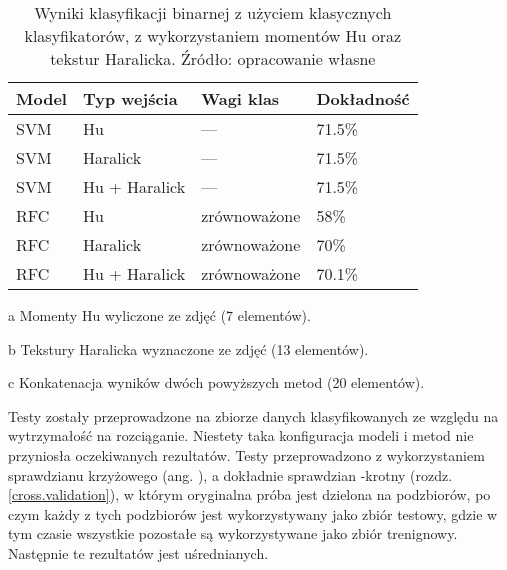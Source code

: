 \begin{table}[h]
	\centering
	\begin{threeparttable}
		\caption{Wyniki klasyfikacji binarnej z użyciem klasycznych klasyfikatorów, z wykorzystaniem momentów Hu oraz tekstur Haralicka. Źródło: opracowanie własne}
		\label{hu_haralick_table}
		\begin{tabularx}{1\textwidth}{ |X|X|X|X| }
		  \hline
		  \textbf{Model} & \textbf{Typ wejścia} & \textbf{Wagi klas} & \textbf{Dokładność}\\

		  \hline
		  SVM & Hu\tnote{a} & — & 71.5\%\\

		  \hline
		  SVM & Haralick\tnote{b} & — & 71.5\%\\

		  \hline
		  SVM & Hu + Haralick\tnote{c} & — & 71.5\%\\

		  \hline
		  RFC & Hu & zrównoważone & 58\%\\

		  \hline
  		  RFC & Haralick & zrównoważone & 70\%\\
  		  
		  \hline
  		  RFC & Hu + Haralick & zrównoważone & 70.1\%\\
  		  
		  \hline
		\end{tabularx}
		\begin{tablenotes}
			\footnotesize
			\item[a] Momenty Hu wyliczone ze zdjęć (7 elementów).
			\item[b] Tekstury Haralicka wyznaczone ze zdjęć (13 elementów).
			\item[c] Konkatenacja wyników dwóch powyższych metod (20 elementów).
		\end{tablenotes}
	\end{threeparttable}
\end{table}
Testy zostały przeprowadzone na zbiorze danych klasyfikowanych ze względu na wytrzymałość na rozciąganie. Niestety taka konfiguracja modeli i metod nie przyniosła oczekiwanych rezultatów. Testy przeprowadzono z wykorzystaniem sprawdzianu krzyżowego (ang. ), a dokładnie sprawdzian -krotny (rozdz. \ref{cross.validation}), w którym oryginalna próba jest dzielona na  podzbiorów, po czym każdy z tych podzbiorów jest wykorzystywany jako zbiór testowy, gdzie w tym czasie wszystkie pozostałe są wykorzystywane jako zbiór trenignowy. Następnie te  rezultatów jest uśrednianych. 
